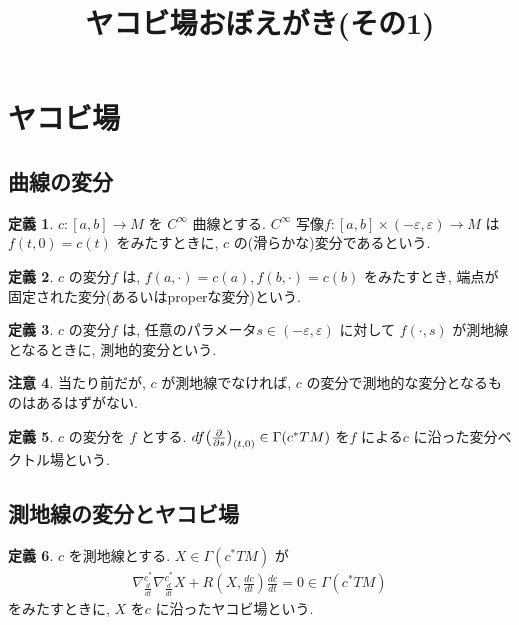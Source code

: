 \documentclass[10pt, fleqn, label-section=none]{bxjsarticle}
\title{ヤコビ場おぼえがき(その1)}
\author{}
\date{}
\theoremstyle{definition}
\newtheorem{dfn}{定義}[section]
\newtheorem{remark}[dfn]{注意}
\newcommand{\veps}{\varepsilon}
\newcommand{\paren}[1]{\mleft( #1\mright )}
\renewcommand{\-}{\hyphen}
\begin{document}
\maketitle

\scriptsize 


\section{ヤコビ場}
\subsection{曲線の変分}

\begin{dfn}
$c:[a,b]\rightarrow M$ を $C^\infty$ 曲線とする. $C^\infty$ 写像$f:[a,b]\times (-\veps, \veps) \rightarrow M$ は \\
$f(t,0) = c(t)$ をみたすときに, $c$ の(滑らかな)変分であるという.
\end{dfn}

\begin{dfn}
$c$ の変分$f$ は, $f(a, \cdot ) = c(a), f(b, \cdot) = c(b)$ をみたすとき, 端点が固定された変分(あるいはproperな変分)という.
\end{dfn}

\begin{dfn}
$c$ の変分$f$ は, 任意のパラメータ$s\in (-\veps, \veps)$ に対して $f(\cdot, s)$ が測地線となるときに, 測地的変分という.
\end{dfn}

\begin{remark}
当たり前だが, $c$ が測地線でなければ, $c$ の変分で測地的な変分となるものはあるはずがない.
\end{remark}

\begin{dfn}
$c$ の変分を $f$ とする. $df\paren{\frac{\partial}{\partial s} }_{(t,0)} \in \Gamma(c^* TM)$ を$f$ による$c$ に沿った変分ベクトル場という.
\end{dfn}

\subsection{測地線の変分とヤコビ場}

\begin{dfn}
$c$ を測地線とする. $X \in \Gamma(c^* TM)$ が
\begin{align*}
\nabla_{\frac{d}{dt} }^{c^*} \nabla_{\frac{d}{dt} }^{c^*} X + R(X, \frac{dc}{dt} ) \frac{dc}{dt} = 0 \in \Gamma(c^* TM)
\end{align*}
をみたすときに, $X$ を$c$ に沿ったヤコビ場という.
\end{dfn}
\end{document}
